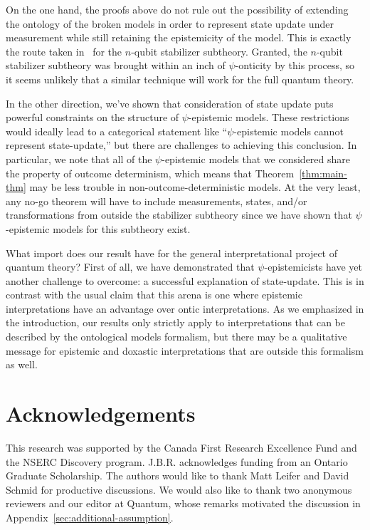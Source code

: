\documentclass[%
 reprint, onecolumn, 12pt,
superscriptaddress,
nofootinbib,
 prx, 
]{quantumarticle}
\begin{document}
On the one hand, the proofs above do not rule out the possibility of
extending the ontology of the broken models in order to represent
state update under measurement while still retaining the epistemicity
of the model. This is exactly the route taken
in~\cite{LillystoneContextualpsEpistemicModel2019} for the $n$-qubit
stabilizer subtheory. Granted, the $n$-qubit stabilizer subtheory was
brought within an inch of $\psi$-onticity by this process, so it seems
unlikely that a similar technique will work for the full quantum
theory.

In the other direction, we've shown that consideration of state update
puts powerful constraints on the structure of $\psi$-epistemic models.
These restrictions would ideally lead to a categorical statement like
``$\psi$-epistemic models cannot represent state-update,'' but there
are challenges to achieving this conclusion. In particular, we note
that all of the $\psi$-epistemic models that we considered share the
property of outcome determinism, which means that
Theorem~\ref{thm:main-thm} may be less trouble in
non-outcome-deterministic models. At the very least, any no-go theorem
will have to include measurements, states, and/or transformations from
outside the stabilizer subtheory since we have shown that
$\psi$-epistemic models for this subtheory exist.

What import does our result have for the general interpretational
project of quantum theory? First of all, we have demonstrated that
$\psi$-epistemicists have yet another challenge to overcome: a
successful explanation of state-update. This is in contrast with the
usual claim that this arena is one where epistemic interpretations
have an advantage over ontic interpretations. As we emphasized in the
introduction, our results only strictly apply to interpretations that
can be described by the ontological models formalism, but there may be
a qualitative message for epistemic and doxastic interpretations that
are outside this formalism as well.




\section{Acknowledgements}
This research was supported by the Canada First Research Excellence
Fund and the NSERC Discovery program. J.B.R. acknowledges funding from
an Ontario Graduate Scholarship. The authors would like to thank Matt
Leifer and David Schmid for productive discussions. We would also like
to thank two anonymous reviewers and our editor at Quantum, whose
remarks motivated the discussion in
Appendix~\ref{sec:additional-assumption}.
\end{document}
